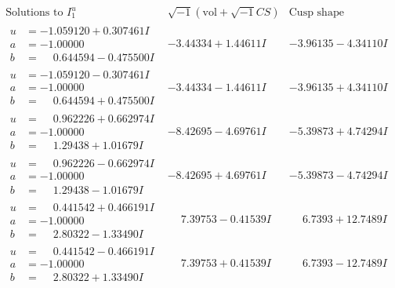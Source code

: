 \documentclass[1p]{elsarticle_modified}
\theoremstyle{definition}
\newcommand{\I}{\sqrt{-1}}
\begin{document}
$$\begin{array}{c|c|c}  
\text{Solutions to }I^u_{1}& \I (\text{vol} + \sqrt{-1}CS) & \text{Cusp shape}\\
 \hline 
\begin{aligned}
u &= -1.059120 + 0.307461 I \\
a &= -1.00000\phantom{ +0.000000I} \\
b &= \phantom{-}0.644594 - 0.475500 I\end{aligned}
 & -3.44334 + 1.44611 I & -3.96135 - 4.34110 I \\ \hline\begin{aligned}
u &= -1.059120 - 0.307461 I \\
a &= -1.00000\phantom{ +0.000000I} \\
b &= \phantom{-}0.644594 + 0.475500 I\end{aligned}
 & -3.44334 - 1.44611 I & -3.96135 + 4.34110 I \\ \hline\begin{aligned}
u &= \phantom{-}0.962226 + 0.662974 I \\
a &= -1.00000\phantom{ +0.000000I} \\
b &= \phantom{-}1.29438 + 1.01679 I\end{aligned}
 & -8.42695 - 4.69761 I & -5.39873 + 4.74294 I \\ \hline\begin{aligned}
u &= \phantom{-}0.962226 - 0.662974 I \\
a &= -1.00000\phantom{ +0.000000I} \\
b &= \phantom{-}1.29438 - 1.01679 I\end{aligned}
 & -8.42695 + 4.69761 I & -5.39873 - 4.74294 I \\ \hline\begin{aligned}
u &= \phantom{-}0.441542 + 0.466191 I \\
a &= -1.00000\phantom{ +0.000000I} \\
b &= \phantom{-}2.80322 - 1.33490 I\end{aligned}
 & \phantom{-}7.39753 - 0.41539 I & \phantom{-}6.7393 + 12.7489 I \\ \hline\begin{aligned}
u &= \phantom{-}0.441542 - 0.466191 I \\
a &= -1.00000\phantom{ +0.000000I} \\
b &= \phantom{-}2.80322 + 1.33490 I\end{aligned}
 & \phantom{-}7.39753 + 0.41539 I & \phantom{-}6.7393 - 12.7489 I \\ \hline\begin{aligned}

\end{aligned}
\end{array}$$
\end{document}
